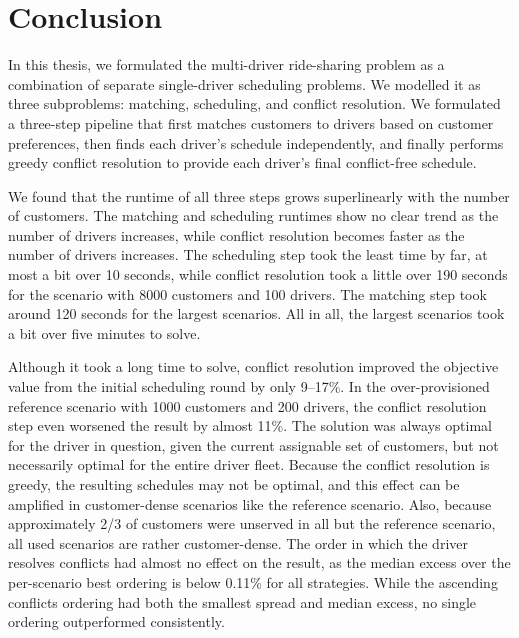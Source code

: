 \section{Conclusion}
\label{sec:conclusion}

In this thesis, we formulated the multi-driver ride-sharing problem as a combination of separate single-driver scheduling problems. We modelled it as three subproblems: matching, scheduling, and conflict resolution. We formulated a three-step pipeline that first matches customers to drivers based on customer preferences, then finds each driver's schedule independently, and finally performs greedy conflict resolution to provide each driver's final conflict-free schedule. 

We found that the runtime of all three steps grows superlinearly with the number of customers. The matching and scheduling runtimes show no clear trend as the number of drivers increases, while conflict resolution becomes faster as the number of drivers increases. The scheduling step took the least time by far, at most a bit over 10 seconds, while conflict resolution took a little over 190 seconds for the scenario with 8000 customers and 100 drivers. The matching step took around 120 seconds for the largest scenarios. All in all, the largest scenarios took a bit over five minutes to solve.

Although it took a long time to solve, conflict resolution improved the objective value from the initial scheduling round by only 9–17\%. In the over-provisioned reference scenario with 1000 customers and 200 drivers, the conflict resolution step even worsened the result by almost 11\%. The solution was always optimal for the driver in question, given the current assignable set of customers, but not necessarily optimal for the entire driver fleet. Because the conflict resolution is greedy, the resulting schedules may not be optimal, and this effect can be amplified in customer-dense scenarios like the reference scenario. Also, because approximately 2/3 of customers were unserved in all but the reference scenario, all used scenarios are rather customer-dense. The order in which the driver resolves conflicts had almost no effect on the result, as the median excess over the per-scenario best ordering is below 0.11\% for all strategies. While the ascending conflicts ordering had both the smallest spread and median excess, no single ordering outperformed consistently.

